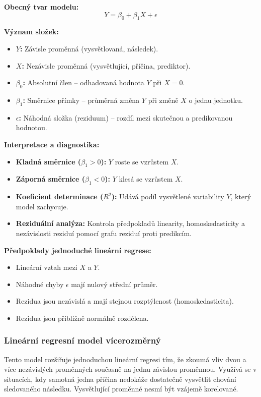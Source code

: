 \textbf{Obecný tvar modelu:}
$$Y = \beta_0 + \beta_1 X + \epsilon$$

\textbf{Význam složek:}
\begin{itemize}
    \item \textbf{$Y$:} Závisle proměnná (vysvětlovaná, následek).
    \item \textbf{$X$:} Nezávisle proměnná (vysvětlující, příčina, prediktor).
    \item \textbf{$\beta_0$:} Absolutní člen -- odhadovaná hodnota $Y$ při $X=0$.
    \item \textbf{$\beta_1$:} Směrnice přímky -- průměrná změna $Y$ při změně $X$ o jednu jednotku.
    \item \textbf{$\epsilon$:} Náhodná složka (reziduum) -- rozdíl mezi skutečnou a predikovanou hodnotou.
\end{itemize}

\textbf{Interpretace a diagnostika:}
\begin{itemize}
    \item \textbf{Kladná směrnice ($\beta_1>0$):} $Y$ roste se vzrůstem $X$.
    \item \textbf{Záporná směrnice ($\beta_1<0$):} $Y$ klesá se vzrůstem $X$.
    \item \textbf{Koeficient determinace ($R^2$):} Udává podíl vysvětlené variability $Y$, který model zachycuje.
    \item \textbf{Reziduální analýza:} Kontrola předpokladů linearity, homoskedasticity a nezávislosti reziduí pomocí grafu reziduí proti predikcím.
\end{itemize}

\textbf{Předpoklady jednoduché lineární regrese:}
\begin{itemize}
    \item Lineární vztah mezi $X$ a $Y$.
    \item Náhodné chyby $\epsilon$ mají nulový střední průměr.
    \item Rezidua jsou nezávislá a mají stejnou rozptýlenost (homoskedasticita).
    \item Rezidua jsou přibližně normálně rozdělena.
\end{itemize}

\subsubsection*{Lineární regresní model vícerozměrný}

Tento model rozšiřuje jednoduchou lineární regresi tím, že zkoumá vliv dvou a více nezávislých proměnných současně na jednu závislou proměnnou. Využívá se v situacích, kdy samotná jedna příčina nedokáže dostatečně vysvětlit chování sledovaného následku.
Vysvětlující proměnné nesmí být vzájemě korelované.

